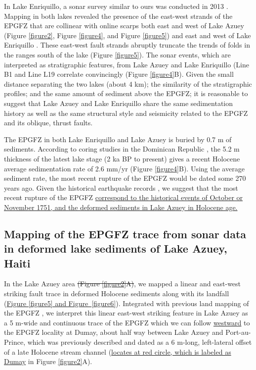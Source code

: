 \documentclass[linenumbers,draft]{agujournal}
\begin{document}
In Lake Enriquillo, a sonar survey similar to ours was conducted in 2013 \citep{rios2013holocene}. Mapping in both lakes revealed the presence of the east-west strands of the EPGFZ that are collinear with online scarps both east and west of Lake Azuey (Figure \ref{figure2}, Figure \ref{figure4}, and Figure \ref{figure5}) and east and west of Lake Enriquillo \citep{mann1995actively,rios2013holocene}. These east-west fault strands abruptly truncate the trends of folds in the ranges south of the lake (Figure \ref{figure5}). The sonar events, which are interpreted as stratigraphic features, from Lake Azuey and Lake Enriquillo (Line B1 and Line L19 correlate convincingly (Figure \ref{figure4}B). Given the small distance separating the two lakes (about 4 km); the similarity of the stratigraphic profiles; and the same amount of sediment above the EPGFZ; it is reasonable to suggest that Lake Azuey and Lake Enriquillo share the same sedimentation history as well as the same structural style and seismicity related to the EPGFZ and its oblique, thrust faults.

The EPGFZ in both Lake Enriquillo and Lake Azuey is buried by 0.7 m of sediments. According to coring studies in the Dominican Republic \citep{taylor1985stratigraphy,rios2013holocene}, the 5.2 m thickness of the latest lake stage (2 ka BP to present) gives a recent Holocene average sedimentation rate of 2.6 mm/yr (Figure \ref{figure4}B). Using the average sediment rate, the most recent rupture of the EPGFZ would be dated some 270 years ago. Given the historical earthquake records \citep{bakun2012significant}, we suggest that the most recent rupture of the EPGFZ \ul{correspond to the historical events of October or November 1751, and the deformed sediments in Lake Azuey in Holocene age.}

\subsection{Mapping of the EPGFZ trace from sonar data in deformed lake sediments of Lake Azuey, Haiti}
In the Lake Azuey area \st{(Figure {\ref{figure2}}A)}, we mapped a linear and east-west striking fault trace in deformed Holocene sediments along with its landfall (\underline{Figure \ref{figure5} and Figure~\ref{figure6}}). Integrated with previous land mapping of the EPGFZ \citep{bourgueil1988synthese,mann1995actively,prentice2010seismic,cowgill2012interactive}, we interpret this linear east-west striking feature in Lake Azuey as a 5 m-wide and continuous trace of the EPGFZ which we can follow \ul{westward} to the EPGFZ locality at Dumay, about half way between Lake Azuey and Port-au-Prince, which was previously described and dated as a 6 m-long, left-lateral offset of a late Holocene stream channel \citep{cowgill2012interactive} (\ul{locates at red circle, which is labeled as Dumay} in Figure \ref{figure2}A). 
\end{document}
